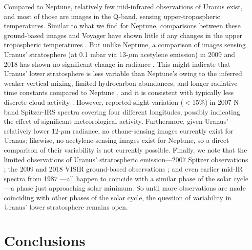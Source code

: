 \documentclass[twocolumn,10pt]{aastex631}
\begin{document}
Compared to Neptune, relatively few mid-infrared observations of Uranus exist, and most of those are images in the Q-band, sensing upper-tropospheric temperatures.  Similar to what we find for Neptune, comparisons between these ground-based images and Voyager have shown little if any changes in the upper tropospheric temperatures \citep{orton2015thermal,roman2020uranus}. But unlike Neptune, a comparison of images sensing Uranus' stratosphere (at 0.1 mbar via 13-$\mu$m acetylene emission) in 2009 and 2018 has shown no significant change in radiance \citep{orton2018neii,roman2020uranus}. This might indicate that Uranus' lower stratosphere is less variable than Neptune's owing to the inferred weaker vertical mixing, limited hydrocarbon abundances, and longer radiative time constants compared to Neptune \citep{conrath1990temperature,moses2018seasonal,li2018high,moses2020icegiantchem}, and it is consistent with typically less discrete cloud activity \citep[\textit{e.g.,}][]{hammel2005new,sromovsky2005dynamics, sromovsky2009uranus,hammel2007long,depater2011Uranus, depater2015record,roman2018aerosols}. However, \citet{rowe2021longitudinal} reported slight variation ($<$15$\%$) in 2007 N-band Spitzer-IRS spectra covering four different longitudes, possibly indicating the effect of significant meteorological activity.   Furthermore, given Uranus' relatively lower 12-$\mu$m radiance, no ethane-sensing images currently exist for Uranus; likewise, no acetylene-sensing images exist for Neptune, so a direct comparison of their variability is not currently possible.  Finally, we note that the limited observations of Uranus' stratospheric emission---2007 Spitzer observations \citep{orton2014a,orton2014mid, rowe2021longitudinal}; the 2009 and 2018 VISIR ground-based observations \citep{roman2020uranus}; and even earlier mid-IR spectra from 1987 \citep{orton1987spectra}---all happen to coincide with a similar phase of the solar cycle---a phase just approaching solar minimum.  So until more observations are made coinciding with other phases of the solar cycle, the question of variability in Uranus' lower stratosphere remains open. 

\section{Conclusions}\label{sec:conclude}
\end{document}
